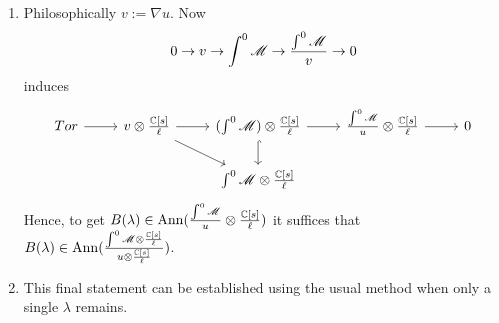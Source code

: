 \begin{enumerate}
  \item Philosophically $v := \nabla u$. Now
  $$0 \to v \to \int^0 \mathscr{M} \to \frac{\int^0 \mathscr{M}}{v} \to 0 $$
  induces
  $$\begin{tikzcd}
    Tor\arrow{r} & v\otimes \frac{\C[s]}{\ell}\arrow{r}\arrow{rd} & (\int^0 \M) \otimes \frac{\C[s]}{\ell}\arrow{r}\arrow[hookrightarrow]{d} & \frac{\int^0 \M}{u} \otimes \frac{\C[s]}{\ell}\arrow{r} & 0\\
    & & \int^0 \M \otimes \frac{\C[s]}{\ell}
  \end{tikzcd} $$
  Hence, to get $B(\lambda)\in \operatorname{Ann}(\frac{\int^0 \mathscr{M}}{u} \otimes \frac{\mathbb{C}[s]}{\ell})$ it suffices that $B(\lambda) \in \operatorname{Ann}(\frac{\int^0 \mathscr{M} \otimes \frac{\mathbb{C}[s]}{\ell}}{u \otimes \frac{\mathbb{C}[s]}{\ell}})$.
  \item This final statement can be established using the usual method when only a single $\lambda$ remains.
\end{enumerate}
